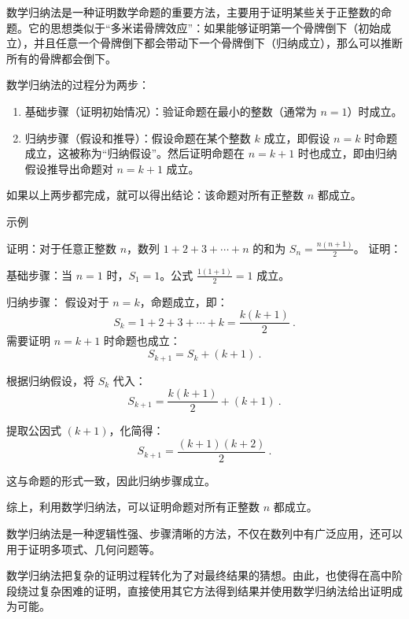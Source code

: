 
\begin{issues}
\issueDraft
\end{issues}

数学归纳法是一种证明数学命题的重要方法，主要用于证明某些关于正整数的命题。它的思想类似于“多米诺骨牌效应”：如果能够证明第一个骨牌倒下（初始成立），并且任意一个骨牌倒下都会带动下一个骨牌倒下（归纳成立），那么可以推断所有的骨牌都会倒下。

数学归纳法的过程分为两步：
\begin{enumerate}
\item 基础步骤（证明初始情况）：验证命题在最小的整数（通常为 $n = 1$）时成立。
\item 归纳步骤（假设和推导）：假设命题在某个整数 $k$ 成立，即假设 $n = k$ 时命题成立，这被称为“归纳假设”。然后证明命题在 $n = k+1$ 时也成立，即由归纳假设推导出命题对 $n = k+1$ 成立。
\end{enumerate}

如果以上两步都完成，就可以得出结论：该命题对所有正整数 $n$ 都成立。

示例
\begin{example}{证明：对于任意正整数 $n$，数列 $1 + 2 + 3 + \cdots + n$ 的和为 $S_n = \frac{n(n+1)}{2}$。}
证明：

基础步骤：当 $n = 1$ 时，$S_1 = 1$。公式 $\frac{1(1+1)}{2} = 1$ 成立。

归纳步骤：
假设对于 $n = k$，命题成立，即：
\begin{equation}
S_k = 1 + 2 + 3 + \cdots + k = \frac{k(k+1)}{2}~.
\end{equation}
需要证明 $n = k+1$ 时命题也成立：
\begin{equation}
S_{k+1} = S_k + (k+1)~.
\end{equation}

根据归纳假设，将 $S_k$ 代入：
\begin{equation}
S_{k+1} = \frac{k(k+1)}{2} + (k+1)~.
\end{equation}

提取公因式 $(k+1)$，化简得：
\begin{equation}
S_{k+1} = \frac{(k+1)(k+2)}{2}~.
\end{equation}

这与命题的形式一致，因此归纳步骤成立。

综上，利用数学归纳法，可以证明命题对所有正整数 $n$ 都成立。
\end{example}

数学归纳法是一种逻辑性强、步骤清晰的方法，不仅在数列中有广泛应用，还可以用于证明多项式、几何问题等。

数学归纳法把复杂的证明过程转化为了对最终结果的猜想。由此，也使得在高中阶段绕过复杂困难的证明，直接使用其它方法得到结果并使用数学归纳法给出证明成为可能。